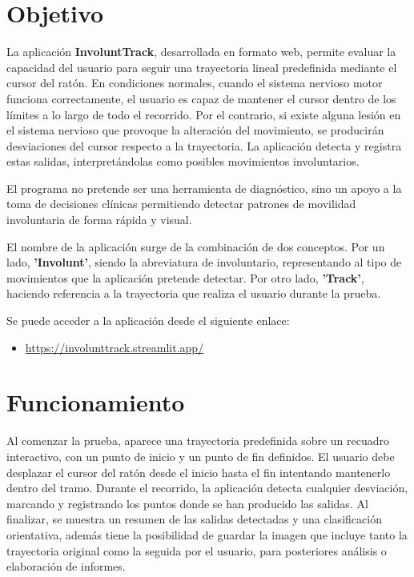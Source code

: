 
\section{Objetivo}

La aplicación \textbf{InvoluntTrack}, desarrollada en formato web, permite evaluar la capacidad del usuario para seguir una trayectoria lineal predefinida mediante el cursor del ratón. En condiciones normales, cuando el sistema nervioso motor funciona correctamente, el usuario es capaz de mantener el cursor dentro de los límites a lo largo de todo el recorrido. Por el contrario, si existe alguna lesión en el sistema nervioso que provoque la alteración del movimiento, se producirán desviaciones del cursor respecto a la trayectoria. La aplicación detecta y registra estas salidas, interpretándolas como posibles movimientos involuntarios.

El programa no pretende ser una herramienta de diagnóstico, sino un apoyo a la toma de decisiones clínicas permitiendo detectar patrones de movilidad involuntaria de forma rápida y visual.

El nombre de la aplicación surge de la combinación de dos conceptos. Por un lado, \textbf{'Involunt'}, siendo la abreviatura de involuntario, representando al tipo de movimientos que la aplicación pretende detectar. Por otro lado, \textbf{'Track'}, haciendo referencia a la trayectoria que realiza el usuario durante la prueba.

Se puede acceder a la aplicación desde el siguiente enlace:
\begin{itemize}
\item \url{https://involunttrack.streamlit.app/}
\end{itemize}
	
\clearpage
\section{Funcionamiento}
Al comenzar la prueba, aparece una trayectoria predefinida sobre un recuadro interactivo, con un punto de inicio y un punto de fin definidos. El usuario debe desplazar el cursor del ratón desde el inicio hasta el fin intentando mantenerlo dentro del tramo. Durante el recorrido, la aplicación detecta cualquier desviación, marcando y registrando los puntos donde se han producido las salidas. Al finalizar, se muestra un resumen de las salidas detectadas y una clasificación orientativa, además tiene la posibilidad de guardar la imagen que incluye tanto la trayectoria original como la seguida por el usuario, para posteriores análisis o elaboración de informes.

